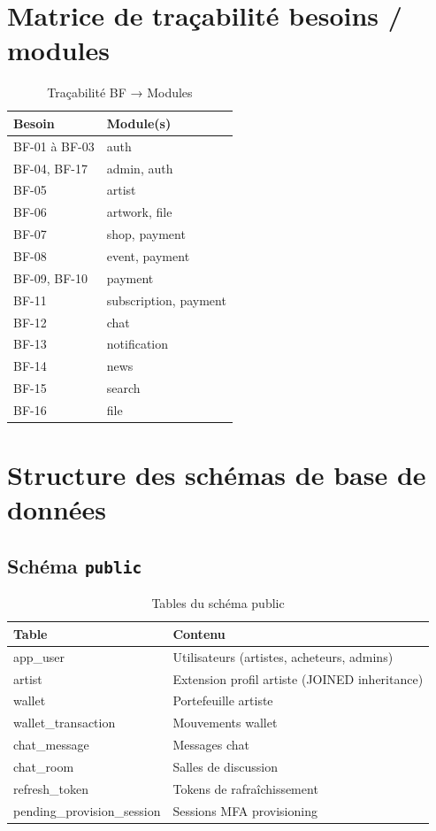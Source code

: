 \section{Matrice de traçabilité besoins / modules}

\begin{table}[h]
  \centering
  \caption{Traçabilité BF → Modules}
  \label{tab:trace}
  \small
  \begin{tabular}{@{}ll@{}}
    \toprule
    \textbf{Besoin} & \textbf{Module(s)} \\
    \midrule
    BF-01 à BF-03 & auth \\
    BF-04, BF-17  & admin, auth \\
    BF-05         & artist \\
    BF-06         & artwork, file \\
    BF-07         & shop, payment \\
    BF-08         & event, payment \\
    BF-09, BF-10  & payment \\
    BF-11         & subscription, payment \\
    BF-12         & chat \\
    BF-13         & notification \\
    BF-14         & news \\
    BF-15         & search \\
    BF-16         & file \\
    \bottomrule
  \end{tabular}
\end{table}

\section{Structure des schémas de base de données}

\subsection{Schéma \texttt{public}}

\begin{table}[h]
  \centering
  \caption{Tables du schéma public}
  \label{tab:db-public}
  \begin{tabular}{@{}ll@{}}
    \toprule
    \textbf{Table} & \textbf{Contenu} \\
    \midrule
    app\_user & Utilisateurs (artistes, acheteurs, admins) \\
    artist & Extension profil artiste (JOINED inheritance) \\
    wallet & Portefeuille artiste \\
    wallet\_transaction & Mouvements wallet \\
    chat\_message & Messages chat \\
    chat\_room & Salles de discussion \\
    refresh\_token & Tokens de rafraîchissement \\
    pending\_provision\_session & Sessions MFA provisioning \\
    \bottomrule
  \end{tabular}
\end{table}

